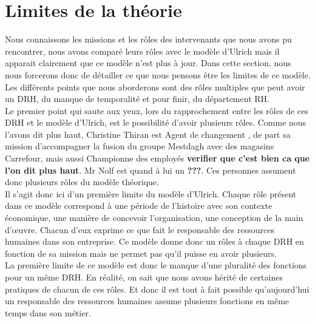 \section{Limites de la théorie}

Nous connaissons les missions et les rôles des intervenants que nous avons pu rencontrer, nous avons comparé leurs rôles avec le modèle d'Ulrich mais il apparait clairement que ce modèle n'est plus à jour. Dans cette section, nous nous forcerons donc de détailler ce que nous pensons être les limites de ce modèle. Les différents points que nous aborderons sont des rôles multiples que peut avoir un DRH, du manque de temporalité et pour finir, du département RH. \\



Le premier point qui saute aux yeux, lors du rapprochement entre les rôles de ces DRH et le modèle d'Ulrich, est le possibilité d'avoir plusieurs rôles. Comme nous l'avons dit plus haut, Christine Thiran est \og Agent de changement \fg{}, de part sa mission d'accompagner la fusion du groupe Mestdagh avec des magasins Carrefour, mais aussi \og Championne des employés \fg{} \textbf{verifier que c'est bien ca que l'on dit plus haut}. Mr Nolf est quand à lui un \textbf{???}. Ces personnes assument donc plusieurs rôles du modèle théorique. \\

Il s'agit donc ici d'un première limite du modèle d'Ulrich. Chaque rôle présent dans ce modèle correspond à une période de l'histoire avec son contexte économique, une manière de concevoir l'organisation, une conception de la main d'œuvre. Chacun d'eux exprime ce que fait le responsable des ressources humaines dans son entreprise. Ce modèle donne donc un rôles à chaque DRH en fonction de sa mission %
  mais ne permet pas qu'il puisse en avoir plusieurs.\\ 

La première limite de ce modèle est donc le manque d'une pluralité des fonctions pour un même DRH. En réalité, on sait que nous avons hérité de certaines pratiques de chacun de ces rôles. Et donc il est tout à fait possible qu'aujourd'hui un responsable des ressources humaines assume plusieurs fonctions en même temps dans son métier. \\

